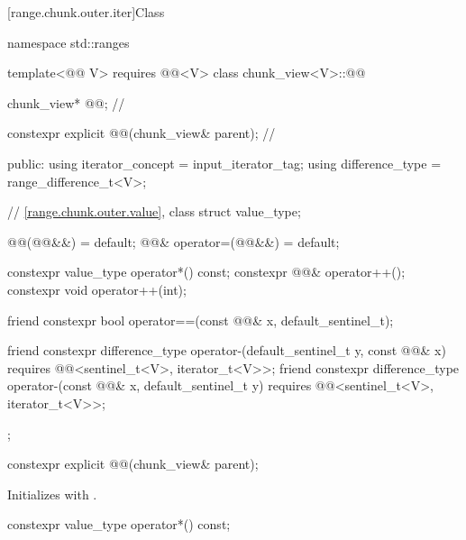 [range.chunk.outer.iter]{Class }

%
\begin{codeblock}
namespace std::ranges {
  template<@@ V>
    requires @@<V>
  class chunk_view<V>::@@ {
    chunk_view* @@;                                        // \expos

    constexpr explicit @@(chunk_view& parent);      // \expos

  public:
    using iterator_concept = input_iterator_tag;
    using difference_type  = range_difference_t<V>;

    // \ref{range.chunk.outer.value}, class 
    struct value_type;

    @@(@@&&) = default;
    @@& operator=(@@&&) = default;

    constexpr value_type operator*() const;
    constexpr @@& operator++();
    constexpr void operator++(int);

    friend constexpr bool operator==(const @@& x, default_sentinel_t);

    friend constexpr difference_type operator-(default_sentinel_t y, const @@& x)
      requires @@<sentinel_t<V>, iterator_t<V>>;
    friend constexpr difference_type operator-(const @@& x, default_sentinel_t y)
      requires @@<sentinel_t<V>, iterator_t<V>>;
  };
}
\end{codeblock}

%
\begin{itemdecl}
constexpr explicit @@(chunk_view& parent);
\end{itemdecl}

\begin{itemdescr}
\pnum
\effects
Initializes  with .
\end{itemdescr}

%
\begin{itemdecl}
constexpr value_type operator*() const;
\end{itemdecl}

